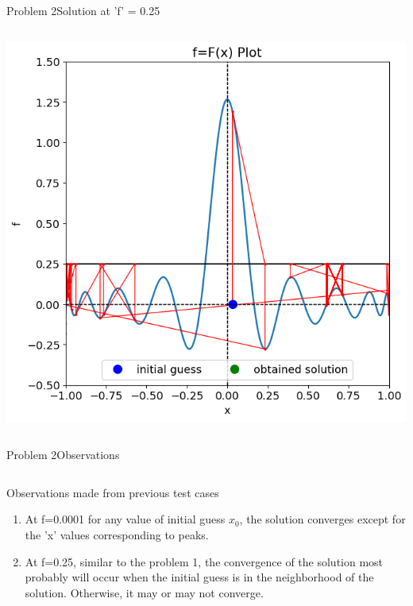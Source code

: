 \documentclass{beamer}
\begin{document}
\begin{frame}{Problem 2}{Solution at 'f' = 0.25}
\begin{columns}
\begin{block}{}
            \includegraphics[width=\textwidth]{Figures/prob2_sol22.png}
        \end{block}
    \end{columns}
\end{frame}

\begin{frame}{Problem 2}{Observations}
    \begin{columns}
        \begin{block}{\footnotesize Observations made from previous test cases}
            \begin{enumerate}
                \footnotesize
                \item At f=0.0001 for any value of initial guess $x_0$, the solution converges except for the 'x' values corresponding to peaks.
                \item At f=0.25, similar to the problem 1, the convergence of the solution most probably will occur when the initial guess is in the neighborhood of the solution. Otherwise, it may or may not converge.
            \end{enumerate}
        \end{block}
    \end{columns}
\end{frame}
\end{document}
